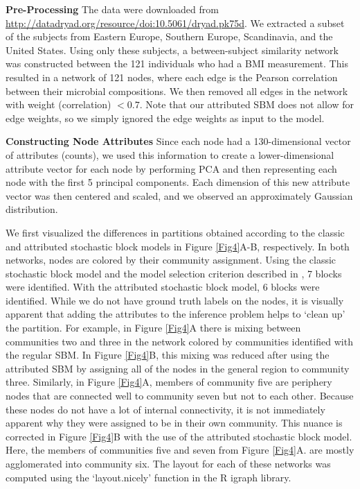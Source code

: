 {\bf Pre-Processing}
The data were downloaded from \url{http://datadryad.org/resource/doi:10.5061/dryad.pk75d}. We extracted a subset of the subjects from Eastern Europe, Southern Europe, Scandinavia, and the United States. Using only these subjects, a between-subject similarity network was constructed between the 121 individuals who had a BMI measurement. This resulted in a network of 121 nodes, where each edge is the Pearson correlation between their microbial compositions. We then removed all edges in the network with weight (correlation) $<0.7$. Note that our attributed SBM does not allow for edge weights, so we simply ignored the edge weights as input to the model.

{\bf Constructing Node Attributes}
Since each node had a 130-dimensional vector of attributes (counts), we used this information to create a lower-dimensional attribute vector for each node by performing PCA and then representing each node with the first 5 principal components. Each dimension of this new attribute vector was then centered and scaled, and we observed an approximately Gaussian distribution. 

We first visualized the differences in partitions obtained according to the classic and attributed stochastic block models in Figure \ref{Fig4}A-B, respectively. In both networks, nodes are colored by their community assignment. Using the classic stochastic block model and the model selection criterion described in \cite{dudin}, 7 blocks were identified. With the attributed stochastic block model, 6 blocks were identified. While we do not have ground truth labels on the nodes, it is visually apparent that adding the attributes to the inference problem helps to `clean up' the partition. For example, in Figure \ref{Fig4}A there is mixing between communities two and three in the network colored by communities identified with the regular SBM. In Figure \ref{Fig4}B, this mixing was reduced after using the attributed SBM by assigning all of the nodes in the general region to community three. Similarly, in Figure \ref{Fig4}A, members of community five are periphery nodes that are connected well to community seven but not to each other. Because these nodes do not have a lot of internal connectivity, it is not immediately apparent why they were assigned to be in their own community. This nuance is corrected in Figure \ref{Fig4}B with the use of the attributed stochastic block model. Here, the members of communities five and seven from Figure \ref{Fig4}A. are mostly agglomerated into community six. The layout for each of these networks was computed using the `layout.nicely' function in the R igraph library.  

